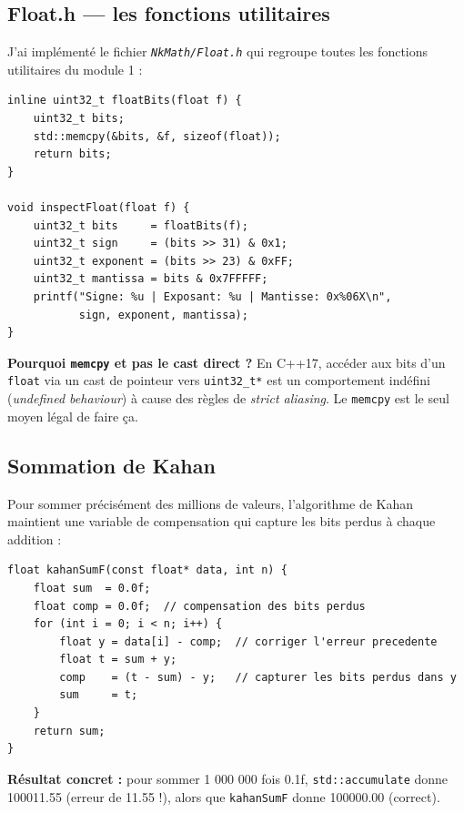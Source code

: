 \documentclass[12pt,a4paper]{report}
\newcommand{\code}[1]{\texttt{\textcolor{myblue}{#1}}}
\newcommand{\file}[1]{\texttt{\textit{#1}}}
\begin{document}
\subsection{Float.h — les fonctions utilitaires}

J'ai implémenté le fichier \file{NkMath/Float.h} qui regroupe toutes les fonctions utilitaires du module 1 :

\begin{lstlisting}[caption={Accès aux bits d'un flottant (C++17 légal via memcpy)}]
inline uint32_t floatBits(float f) {
    uint32_t bits;
    std::memcpy(&bits, &f, sizeof(float));
    return bits;
}

void inspectFloat(float f) {
    uint32_t bits     = floatBits(f);
    uint32_t sign     = (bits >> 31) & 0x1;
    uint32_t exponent = (bits >> 23) & 0xFF;
    uint32_t mantissa = bits & 0x7FFFFF;
    printf("Signe: %u | Exposant: %u | Mantisse: 0x%06X\n",
           sign, exponent, mantissa);
}
\end{lstlisting}

\textbf{Pourquoi \code{memcpy} et pas le cast direct ?} En C++17, accéder aux bits d'un \code{float} via un cast de pointeur vers \code{uint32_t*} est un comportement indéfini (\textit{undefined behaviour}) à cause des règles de \textit{strict aliasing}. Le \code{memcpy} est le seul moyen légal de faire ça.

\subsection{Sommation de Kahan}

Pour sommer précisément des millions de valeurs, l'algorithme de Kahan maintient une variable de compensation qui capture les bits perdus à chaque addition :

\begin{lstlisting}[caption={Sommation de Kahan — précision compensée}]
float kahanSumF(const float* data, int n) {
    float sum  = 0.0f;
    float comp = 0.0f;  // compensation des bits perdus
    for (int i = 0; i < n; i++) {
        float y = data[i] - comp;  // corriger l'erreur precedente
        float t = sum + y;
        comp    = (t - sum) - y;   // capturer les bits perdus dans y
        sum     = t;
    }
    return sum;
}
\end{lstlisting}

\textbf{Résultat concret :} pour sommer 1 000 000 fois 0.1f, \code{std::accumulate} donne 100011.55 (erreur de 11.55 !), alors que \code{kahanSumF} donne 100000.00 (correct).
\end{document}
